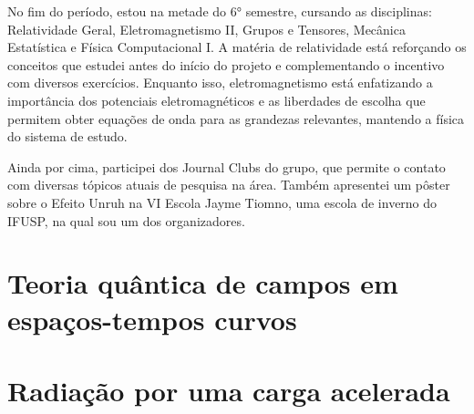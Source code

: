 \documentclass[11pt, a4paper]{article}
\begin{document}
No fim do período, estou na metade do 6° semestre, cursando as disciplinas: Relatividade Geral, Eletromagnetismo II, Grupos e Tensores, Mecânica Estatística e Física Computacional I. A matéria de relatividade está reforçando os conceitos que estudei antes do início do projeto e complementando o incentivo com diversos exercícios. Enquanto isso, eletromagnetismo está enfatizando a importância dos potenciais eletromagnéticos e as liberdades de escolha que permitem obter equações de onda para as grandezas relevantes, mantendo a física do sistema de estudo.

Ainda por cima, participei dos Journal Clubs do grupo, que permite o contato com diversas tópicos atuais de pesquisa na área. Também apresentei um pôster sobre o Efeito Unruh na VI Escola Jayme Tiomno, uma escola de inverno do IFUSP, na qual sou um dos organizadores.

\section{Teoria quântica de campos em espaços-tempos curvos}

\section{Radiação por uma carga acelerada}
\end{document}
